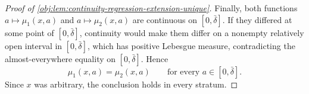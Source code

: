 \begin{proof}[Proof of \cref{obj:lem:continuity-regression-extension-unique}]
Finally, both functions \(a\mapsto\mu_1(x,a)\) and \(a\mapsto\mu_2(x,a)\) are continuous on \([0,\bar\delta]\).  If they differed at some point of \([0,\bar\delta]\), continuity would make them differ on a nonempty relatively open interval in \([0,\bar\delta]\), which has positive Lebesgue measure, contradicting the almost-everywhere equality on \([0,\bar\delta]\).  Hence
\[
\mu_1(x,a)=\mu_2(x,a)
\qquad\text{for every }a\in[0,\bar\delta].
\]%
Since \(x\) was arbitrary, the conclusion holds in every stratum.
\end{proof}
